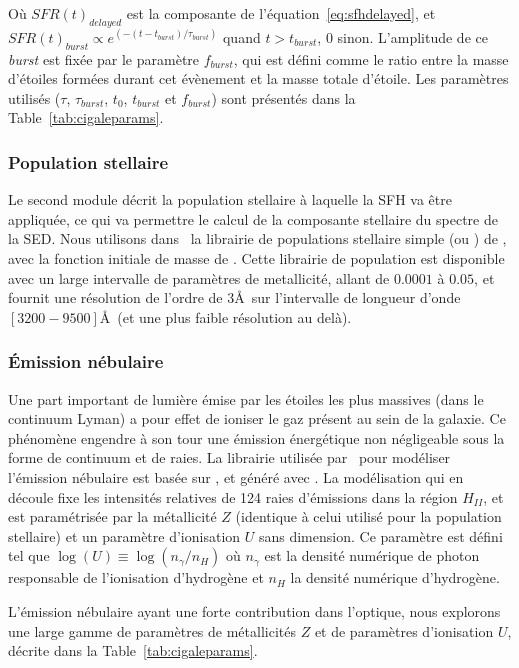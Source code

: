 \documentclass[../main/main.tex]{subfiles}
\begin{document}
Où $SFR(t)_{delayed}$ est la composante de l'équation~\ref{eq:sfhdelayed}, et $SFR(t)_{burst}\propto e^{(-(t-t_{burst})/\tau_{burst})}$ quand $t>t_{burst}$, $0$ sinon. L'amplitude de ce \textit{burst} est fixée par le paramètre $f_{burst}$, qui est défini comme le ratio entre la masse d'étoiles formées durant cet évènement et la masse totale d'étoile. Les paramètres utilisés ($\tau$, $\tau_{burst}$, $t_0$, $t_{burst}$ et $f_{burst}$) sont présentés dans la Table~\ref{tab:cigaleparams}.

\subsubsection{Population stellaire}
Le second module décrit la population stellaire à laquelle la SFH va être appliquée, ce qui va permettre le calcul de la composante stellaire du spectre de la SED. Nous utilisons dans \hypergal\ la librairie de populations stellaire simple \textbf{} (ou ) de \citet{BCO3}, avec la fonction initiale de masse de \citet{Chabrier2003}. Cette librairie de population est disponible avec un large intervalle de paramètres de metallicité, allant de $0.0001$ à $0.05$, et fournit une résolution de l'ordre de $3$\AA\ sur l'intervalle de longueur d'onde $[3200-9500]$\AA\ (et une plus faible résolution au delà).


\subsubsection{\'Emission nébulaire}

Une part important de lumière émise par les étoiles les plus massives (dans le continuum Lyman) a pour effet de ioniser le gaz présent au sein de la galaxie. Ce phénomène engendre à son tour une émission énergétique non négligeable sous la forme de continuum et de raies. La librairie utilisée par \cigale\ pour modéliser l'émission nébulaire est basée sur \citet{Inoue2011}, et généré avec  \citep{Ferland2013}.
La modélisation qui en découle fixe les intensités relatives de 124 raies d'émissions dans la région $H_{II}$, et est paramétrisée par la métallicité $Z$ (identique à celui utilisé pour la population stellaire) et un paramètre d'ionisation $U$ sans dimension. Ce paramètre est défini tel que $\log(U)\equiv \log(n_{\gamma}/n_H)$ où $n_{\gamma}$ est la densité numérique de photon responsable de l'ionisation d'hydrogène et $n_H$ la densité numérique d'hydrogène.

L'émission nébulaire ayant une forte contribution dans l'optique, nous explorons une large gamme de paramètres de métallicités $Z$ et de paramètres d'ionisation $U$, décrite dans la Table~\ref{tab:cigaleparams}.
\end{document}
